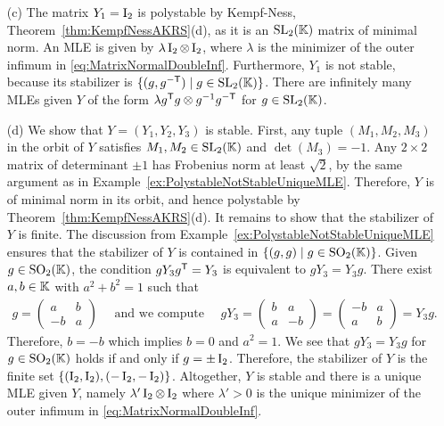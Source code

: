 \begin{example}
\begin{itemize}
		\item[(c)] The matrix $Y_1 = \operatorname{I}_2$ is polystable by Kempf-Ness, Theorem~\ref{thm:KempfNessAKRS}(d), as it is an $\operatorname{SL}_2(\mathbb K)$ matrix of minimal norm. An MLE is given by $\lambda \operatorname{I}_2 \otimes \operatorname{I}_2$, where $\lambda$ is the minimizer of the outer infimum in \eqref{eq:MatrixNormalDoubleInf}. Furthermore, $Y_1$ is not stable, because its stabilizer is $\lbrace (g,g^{-\mathsf{T}}) \mid g \in  \operatorname{SL}_2(\mathbb K) \rbrace$. There are infinitely many MLEs given $Y$ of the form $\lambda g^{\mathsf{T}} g \otimes g^{-1} g^{-\mathsf{T}}$ for $g \in \operatorname{SL}_2(\mathbb K)$.
		
		\item[(d)] We show that $Y = (Y_1,Y_2,Y_3)$ is stable. First, any tuple $(M_1,M_2,M_3)$ in the orbit of $Y$ satisfies $M_1,M_2 \in \operatorname{SL}_2(\mathbb K)$ and $\det(M_3) = -1$. Any $2 \times 2$ matrix of determinant $\pm 1$ has Frobenius norm at least $\sqrt{2}$, by the same argument as in Example~\ref{ex:PolystableNotStableUniqueMLE}. Therefore, $Y$ is of minimal norm in its orbit, and hence polystable by Theorem~\ref{thm:KempfNessAKRS}(d). It remains to show that the stabilizer of $Y$ is finite. The discussion from Example~\ref{ex:PolystableNotStableUniqueMLE} ensures that the stabilizer of $Y$ is contained in $ \lbrace (g,g) \mid g \in \operatorname{SO}_2(\mathbb K) \rbrace$. Given $g \in \operatorname{SO}_2(\mathbb K)$, the condition $g Y_3 g^{\mathsf{T}} = Y_3$ is equivalent to $g Y_3 = Y_3 g$. There exist $a, b \in \mathbb K$ with $a^2 + b^2 = 1$ such that
			\begin{align*}
				g = \begin{pmatrix} a & b\\ -b & a \end{pmatrix}
				\quad \text{ and we compute } \quad
				g Y_3 = \begin{pmatrix} b & a\\ a & -b \end{pmatrix} = \begin{pmatrix} -b & a\\ a & b \end{pmatrix} = Y_3 g.
			\end{align*}
		Therefore, $b = -b$ which implies $b=0$ and $a^2 = 1$. We see that $g Y_3 = Y_3 g$ for $g \in \operatorname{SO}_2(\mathbb K)$ holds if and only if $g = \pm \operatorname{I}_2$. Therefore, the stabilizer of $Y$ is the finite set $\lbrace (\operatorname{I}_2,\operatorname{I}_2) , (-\operatorname{I}_2,-\operatorname{I}_2) \rbrace$. Altogether, $Y$ is stable and there is a unique MLE given $Y$, namely $\lambda' \operatorname{I}_2 \otimes \operatorname{I}_2$ where $\lambda' > 0$ is the unique minimizer of the outer infimum in \eqref{eq:MatrixNormalDoubleInf}.
		\hfill\exSymbol
	\end{itemize}
\end{example}




